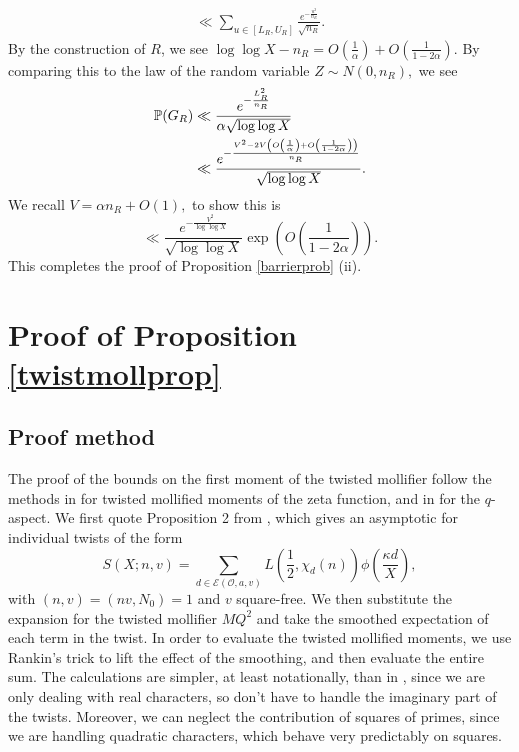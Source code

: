 \documentclass[12pt]{amsart}
\def\P{\ensuremath\mathbb{P}}
\numberwithin{equation}{section}
\numberwithin{thm}{section}
\newcommand{\1}{\mathbf 1}
\begin{document}
\begin{align}
	\ll \sum_{u\in [L_R,U_R]}\frac{e^{-\frac{u^2}{n_R}}}{\sqrt{n_R}}.
\end{align}
By the construction of $R$, we see $\log\log X-n_R=O\left(\frac{1}{\alpha}\right)+O\left(\frac{1}{1-2\alpha}\right).$ By comparing this to the law  of the random variable $Z\sim N(0,n_R),$ we see  \begin{align}
	\P(G_R)&\nonumber\ll \frac{e^{-\frac{L_R^2}{n_R}}}{\alpha\sqrt{\log \log X}}\\& \ll \frac{e^{-\frac{V^2-2V\left(O\left(\frac{1}{\alpha}\right)+O\left(\frac{1}{1-2\alpha}\right)\right)}{n_R}}}{\sqrt{\log\log X}}.\end{align}
	We recall $V=\alpha n_R+O(1),$ to show this is
	 $$\ll \frac{e^{-\frac{V^2}{\log \log X}}}{\sqrt{\log\log X}}\exp\left(O\left(\frac{1}{1-2\alpha}\right)\right).$$
	 This completes the proof of Proposition \ref{barrierprob} (ii).







\section{Proof of Proposition \ref{twistmollprop}}\label{SecTM}
\subsection{Proof method}
The proof of the bounds on the first moment of the twisted mollifier follow the methods in \cite{ABR20} for twisted mollified moments of the zeta function, and in \cite{AC25} for the $q$-aspect. We first quote Proposition 2 from \cite{RS2}, which gives an asymptotic for individual  twists of the form \begin{equation}\label{jointmoment}
	S(X;n,v)=\sum_{d\in\mathcal{E}(\mathscr{O},a,v)} L\left(\frac{1}{2},\chi_d(n)\right) \phi\left(\frac{\kappa d}{X}\right),\end{equation}
	with $(n,v)=(nv,N_0)=1$ and $v$ square-free.
We then substitute the expansion for the twisted mollifier $MQ^2$ and take the smoothed expectation of each term in the twist. In order to evaluate the twisted mollified moments, we use Rankin's trick to lift the effect of the smoothing, and then evaluate the entire sum. The calculations are simpler, at least notationally, than in \cite{AC25}, since we are only dealing with real characters, so don't have to handle the imaginary part of the twists. Moreover, we can neglect the contribution of squares of primes, since we are handling quadratic characters, which behave very predictably on squares.
\end{document}
